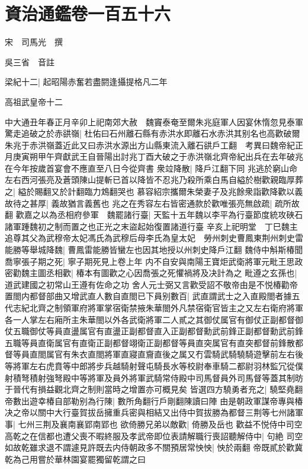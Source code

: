 \chapter{資治通鑑卷一百五十六}
宋　司馬光　撰

吳三省　音註

梁紀十二|{
	起昭陽赤奮若盡閼逢攝提格凡二年}


高祖武皇帝十二

中大通丑年春正月辛卯上祀南郊大赦　魏竇泰奄至爾朱兆庭軍人因宴休惰忽見泰軍驚走追破之於赤谼嶺|{
	杜佑曰石州離石縣有赤洪水即離石水赤洪其别名也高歡破爾朱兆于赤洪嶺蓋近此又曰赤洪水源出方山縣東流入離石谼戶工翻　考異曰魏帝紀正月庚寅朔甲午齊獻武王自晉陽出討兆丁酉大破之于赤洪嶺北齊帝紀出兵在去年破兆在今年按歲首宴會不應直至八日今從齊書}
衆竝降散|{
	降戶江翻下同}
兆逃於窮山命左右西河張亮及蒼頭陳山提斬已首以降皆不忍兆乃殺所乘白馬自縊於樹歡親臨厚葬之|{
	縊於賜翻又於計翻臨力鴆翻哭也}
慕容紹宗攜爾朱榮妻子及兆餘衆詣歡降歡以義故待之甚厚|{
	義故猶言義舊也}
兆之在秀容左右皆密通款於歡唯張亮無啟疏|{
	疏所故翻}
歡嘉之以為丞相府參軍　魏罷諸行臺|{
	天監十五年魏以李平為行臺節度統攻硤石諸軍踵魏初之制而置之也正光之末盜起始復置諸道行臺}
辛亥上祀明堂　丁巳魏主追尊其父為武穆帝太妃馮氏為武穆后母李氏為皇太妃　勞州刺史曹鳳東荆州刺史雷能勝等舉城降魏|{
	曹鳳雷能勝皆蠻左也因其地授以州刺史降戶江翻}
魏侍中斛斯椿聞喬寧張子期之死|{
	寧子期死見上卷上年}
内不自安與南陽王寶炬武衛將軍元毗王思政密勸魏主圖丞相歡|{
	椿本有圖歡之心因喬張之死懼禍將及决計為之}
毗遵之玄孫也|{
	道武建國之初常山王遵有佐命之功}
舍人元士弼又言歡受詔不敬帝由是不悦椿勸帝置閤内都督部曲又增武直人數自直閤已下員别數百|{
	武直謂武士之入直殿閤者據五代志紀北齊之制領軍府將軍掌宿衛禁掖朱華閤外凡禁宿衛官皆主之又左右衛府將軍各一人掌左右廂所主朱華閤以外各武衛將軍二人貳之其御仗属官有御仗正副都督御仗五職御仗等員直盪属官有直盪正副都督直入正副都督勳武前鋒正副都督勳武前鋒五職等員直衛属官有直衛正副都督翊衛正副都督等員直突属官有直突都督前鋒散都督等員直閤属官有朱衣直閤將軍直寢直齎直後之属又冇雲騎武騎驍騎遊擊前左右後等將軍左右虎賁等中郎將步兵越騎射聲屯騎長水等校尉奉車騎二都尉羽林監冗從僕射積弩積射強弩殿中等將軍及員外將軍武騎常侍殿中司馬督員外司馬督等蓋其制昉于晉代有損益觀北齊之制則當時之增置亦可概見矣}
皆選四方驍勇者充之|{
	驍堅堯翻}
帝數出遊幸椿自部勒别為行陳|{
	數所角翻行戶剛翻陳讀曰陣}
由是朝政軍謀帝專與椿决之帝以關中大行臺賀拔岳擁重兵密與相結又出侍中賀拔勝為都督三荆等七州諸軍事|{
	七州三荆及襄南襄郢南郢也}
欲倚勝兄弟以敵歡|{
	倚勝及岳也}
歡益不悦侍中司空高乾之在信都也遭父喪不暇終服及孝武帝即位表請解職行喪詔聽解侍中|{
	句絶}
司空如故乾雖求退不謂遽見許既去内侍朝政多不關預居常怏怏|{
	怏於兩翻}
帝既貳於歡冀乾為己用嘗於華林園宴罷獨留乾謂之曰

